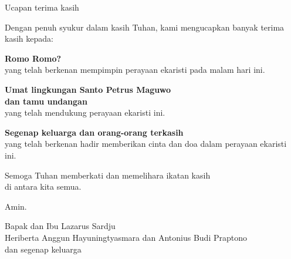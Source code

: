\documentclass[12pt,twoside]{book}
\newcommand{\keluarga}{Lazarus Sardju\xspace}
\newcommand{\calonibu}{Heriberta Anggun Hayuningtyasmara\xspace}
\newcommand{\calonayah}{Antonius Budi Praptono\xspace}
\newcommand{\romo}{Romo?\xspace}
\begin{document}
\newpage
\begin{flushright}
{\Large Ucapan terima kasih}

\noindent Dengan penuh syukur dalam kasih Tuhan, kami mengucapkan banyak
terima kasih kepada:

\textbf{Romo \romo}\\
yang telah berkenan mempimpin perayaan ekaristi pada malam hari ini.

\textbf{Umat lingkungan Santo Petrus Maguwo\\ dan tamu undangan}\\
yang telah mendukung perayaan ekaristi ini.

\textbf{Segenap keluarga dan orang-orang terkasih}\\
yang telah berkenan hadir memberikan cinta dan doa dalam perayaan
ekaristi ini.

Semoga Tuhan memberkati dan memelihara ikatan kasih\\ di antara kita semua.

Amin.

\bigskip 

Bapak dan Ibu \keluarga\\
\calonibu dan \calonayah\\
dan segenap keluarga
\end{flushright}
\end{document}

